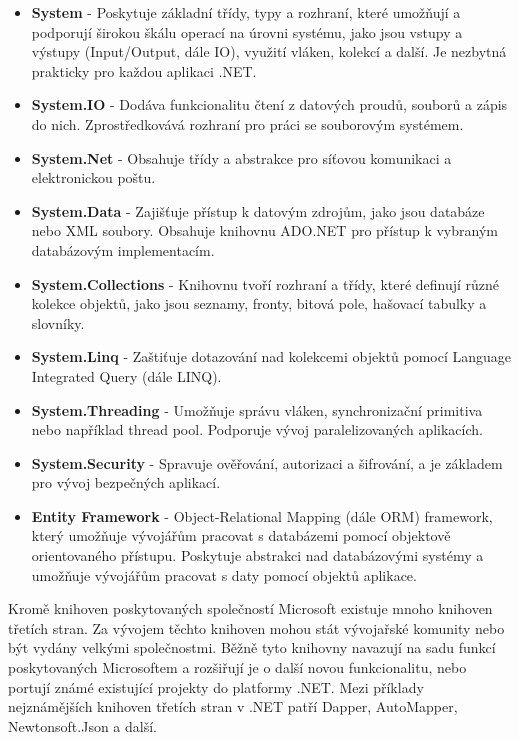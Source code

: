 \begin{itemize}
    \item \textbf{System} - Poskytuje základní třídy, typy a rozhraní, které umožňují a podporují širokou škálu operací na úrovni systému, jako jsou vstupy a výstupy (Input/Output, dále IO), využití vláken, kolekcí a další. Je nezbytná prakticky pro každou aplikaci .NET.
    \item \textbf{System.IO} - Dodáva funkcionalitu čtení z datových proudů, souborů a zápis do nich. Zprostředkovává rozhraní pro práci se souborovým systémem.
    \item \textbf{System.Net} - Obsahuje třídy a abstrakce pro síťovou komunikaci a elektronickou poštu.
    \item \textbf{System.Data} - Zajišťuje přístup k datovým zdrojům, jako jsou databáze nebo XML soubory. Obsahuje knihovnu ADO.NET pro přístup k vybraným databázovým implementacím.
    \item \textbf{System.Collections} - Knihovnu tvoří rozhraní a třídy, které definují různé kolekce objektů, jako jsou seznamy, fronty, bitová pole, hašovací tabulky a slovníky.
    \item \textbf{System.Linq} - Zaštiťuje dotazování nad kolekcemi objektů pomocí Language Integrated Query (dále LINQ).
    \item \textbf{System.Threading} - Umožňuje správu vláken, synchronizační primitiva nebo například thread pool. Podporuje vývoj paralelizovaných aplikacích.
    \item \textbf{System.Security} - Spravuje ověřování, autorizaci a šifrování, a je základem pro vývoj bezpečných aplikací.
    \item \textbf{Entity Framework} - Object-Relational Mapping (dále ORM) framework, který umožňuje vývojářům pracovat s databázemi pomocí objektově orientovaného přístupu. Poskytuje abstrakci nad databázovými systémy a umožňuje vývojářům pracovat s daty pomocí objektů aplikace.
\end{itemize}

Kromě knihoven poskytovaných společností Microsoft existuje mnoho knihoven třetích stran. Za vývojem těchto knihoven mohou stát vývojařské komunity nebo být vydány velkými společnostmi. Běžně tyto knihovny navazují na sadu funkcí poskytovaných Microsoftem a rozšiřují je o další novou funkcionalitu, nebo portují známé existující projekty do platformy .NET. Mezi příklady nejznámějších knihoven třetích stran v .NET patří Dapper, AutoMapper, Newtonsoft.Json a další.

